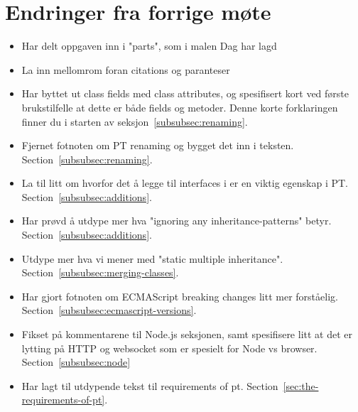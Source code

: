 
\chapter*{Endringer fra forrige møte}

\begin{itemize}
    \item Har delt oppgaven inn i "parts", som i malen Dag har lagd
    \item La inn mellomrom foran citations og paranteser
    \item Har byttet ut class fields med class attributes, og spesifisert kort ved første brukstilfelle at dette er både fields og metoder.
    Denne korte forklaringen finner du i starten av seksjon~\vref{subsubsec:renaming}.
    \item Fjernet fotnoten om PT renaming og bygget det inn i teksten.
    Section~\vref{subsubsec:renaming}.
    \item La til litt om hvorfor det å legge til interfaces i  er en viktig egenskap i PT.
    Section~\vref{subsubsec:additions}.
    \item Har prøvd å utdype mer hva "ignoring any inheritance-patterns" betyr.
    Section~\vref{subsubsec:additions}.
    \item Utdype mer hva vi mener med "static multiple inheritance".
    Section~\vref{subsubsec:merging-classes}.
    \item Har gjort fotnoten om ECMAScript breaking changes litt mer forståelig.
    Section~\vref{subsubsec:ecmascript-versions}.
    \item Fikset på kommentarene til Node.js seksjonen, samt spesifisere litt at det er lytting på HTTP og websocket som er spesielt for Node vs browser.
    Section~\vref{subsubsec:node}
    \item Har lagt til utdypende tekst til requirements of pt.
    Section~\vref{sec:the-requirements-of-pt}.
\end{itemize}

